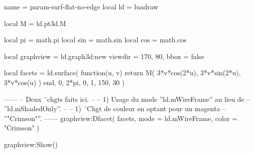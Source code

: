 \documentclass[border = 3pt]{standalone}
\begin{document}
\begin{luadraw*}{name = param-surf-flat-no-edge}
local ld = luadraw

local M = ld.pt3d.M

local pi  = math.pi
local sin = math.sin
local cos = math.cos

local graphview = ld.graph3d:new{
  viewdir = {170, 80},
  bbox    = false
}

local facets = ld.surface(
  function(u, v)
    return M(
      3*v*cos(2*u),
      3*v*sin(2*u),
      3*v*cos(u)
    )
  end,
  0, 2*pi, 0, 1,
  {150, 30}
)

------
-- Deux ¨chgts faits ici.
--
--     1) Usage du mode ''ld.mWireFrame'' au lieu de
--     ''ld.mShadedOnly''.
--
--     1) ¨Chgt de couleur en optant pour un magenta
--     ''"Crimson"''.
------
graphview:Dfacet(
  facets,
  {
    mode  = ld.mWireFrame,
    color = "Crimson"
  }
)

graphview:Show()
\end{luadraw*}
\end{document}
